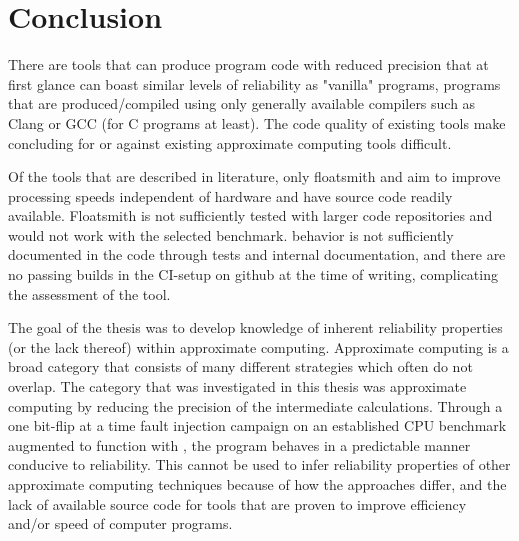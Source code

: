 \section{Conclusion}

There are tools that can produce program code with reduced precision that at first glance can boast similar levels of reliability as "vanilla" programs, programs that are produced/compiled using only generally available compilers such as Clang or GCC (for C programs at least). 
The code quality of existing tools make concluding for or against existing approximate computing tools difficult. 

Of the tools that are described in literature, only floatsmith and \taffo{} aim to improve processing speeds independent of hardware and have source code readily available. Floatsmith is not sufficiently tested with larger code repositories and would not work with the selected benchmark.\taffo{} behavior is not sufficiently documented in the code through tests and internal documentation, and there are no passing builds in the CI-setup on github at the time of writing, complicating the assessment of the tool.

The goal of the thesis was to develop knowledge of inherent reliability properties (or the lack thereof) within approximate computing. Approximate computing is a broad category that consists of many different strategies which often do not overlap. The category that was investigated in this thesis was approximate computing by reducing the precision of the intermediate calculations. Through a one bit-flip at a time fault injection campaign on an established CPU benchmark augmented to function with \taffo{}, the program behaves in a predictable manner conducive to reliability. This cannot be used to infer reliability properties of other approximate computing techniques because of how the approaches differ, and the lack of available source code for  tools that are proven to improve efficiency and/or speed of computer programs. 